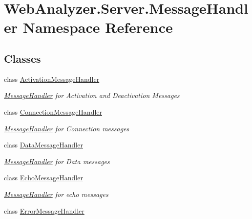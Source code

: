\hypertarget{namespace_web_analyzer_1_1_server_1_1_message_handler}{}\section{Web\+Analyzer.\+Server.\+Message\+Handler Namespace Reference}
\label{namespace_web_analyzer_1_1_server_1_1_message_handler}
\subsection*{Classes}
\begin{DoxyCompactItemize}
\item 
class \hyperlink{class_web_analyzer_1_1_server_1_1_message_handler_1_1_activation_message_handler}{Activation\+Message\+Handler}
\begin{DoxyCompactList}\small\item\em \hyperlink{namespace_web_analyzer_1_1_server_1_1_message_handler}{Message\+Handler} for Activation and Deactivation Messages \end{DoxyCompactList}\item 
class \hyperlink{class_web_analyzer_1_1_server_1_1_message_handler_1_1_connection_message_handler}{Connection\+Message\+Handler}
\begin{DoxyCompactList}\small\item\em \hyperlink{namespace_web_analyzer_1_1_server_1_1_message_handler}{Message\+Handler} for Connection messages \end{DoxyCompactList}\item 
class \hyperlink{class_web_analyzer_1_1_server_1_1_message_handler_1_1_data_message_handler}{Data\+Message\+Handler}
\begin{DoxyCompactList}\small\item\em \hyperlink{namespace_web_analyzer_1_1_server_1_1_message_handler}{Message\+Handler} for Data messages \end{DoxyCompactList}\item 
class \hyperlink{class_web_analyzer_1_1_server_1_1_message_handler_1_1_echo_message_handler}{Echo\+Message\+Handler}
\begin{DoxyCompactList}\small\item\em \hyperlink{namespace_web_analyzer_1_1_server_1_1_message_handler}{Message\+Handler} for echo messages \end{DoxyCompactList}\item 
class \hyperlink{class_web_analyzer_1_1_server_1_1_message_handler_1_1_error_message_handler}{Error\+Message\+Handler}

\end{DoxyCompactItemize}
